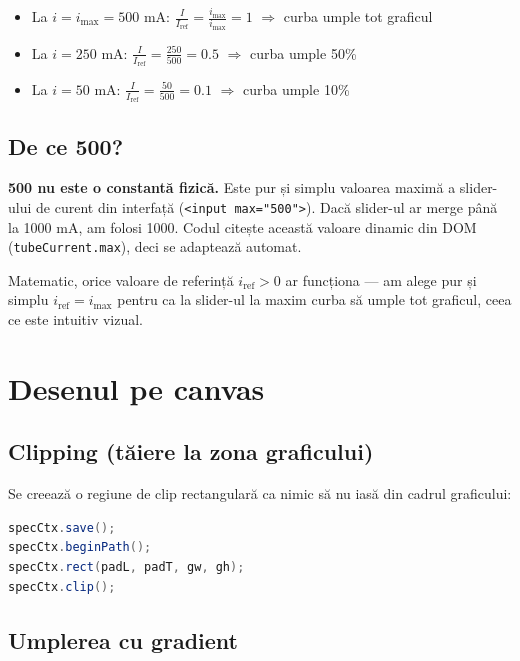 \documentclass[12pt,a4paper]{article}
\begin{document}
\begin{itemize}[leftmargin=2em]
    \item La $i = i_{\max} = 500$ mA: $\frac{I}{I_{\text{ref}}} = \frac{i_{\max}}{i_{\max}} = 1$ $\Rightarrow$ curba umple tot graficul
    \item La $i = 250$ mA: $\frac{I}{I_{\text{ref}}} = \frac{250}{500} = 0.5$ $\Rightarrow$ curba umple 50\%
    \item La $i = 50$ mA: $\frac{I}{I_{\text{ref}}} = \frac{50}{500} = 0.1$ $\Rightarrow$ curba umple 10\%
\end{itemize}

\subsection{De ce 500?}

\textbf{500 nu este o constantă fizică.} Este pur și simplu valoarea maximă a slider-ului de curent din interfață (\texttt{<input max="500">}). Dacă slider-ul ar merge până la 1000 mA, am folosi 1000. Codul citește această valoare dinamic din DOM (\texttt{tubeCurrent.max}), deci se adaptează automat.

Matematic, orice valoare de referință $i_{\text{ref}} > 0$ ar funcționa — am alege pur și simplu $i_{\text{ref}} = i_{\max}$ pentru ca la slider-ul la maxim curba să umple tot graficul, ceea ce este intuitiv vizual.


\section{Desenul pe canvas}

\subsection{Clipping (tăiere la zona graficului)}

Se creează o regiune de clip rectangulară ca nimic să nu iasă din cadrul graficului:

\begin{lstlisting}[language=Java]
specCtx.save();
specCtx.beginPath();
specCtx.rect(padL, padT, gw, gh);
specCtx.clip();
\end{lstlisting}

\subsection{Umplerea cu gradient}
\end{document}
